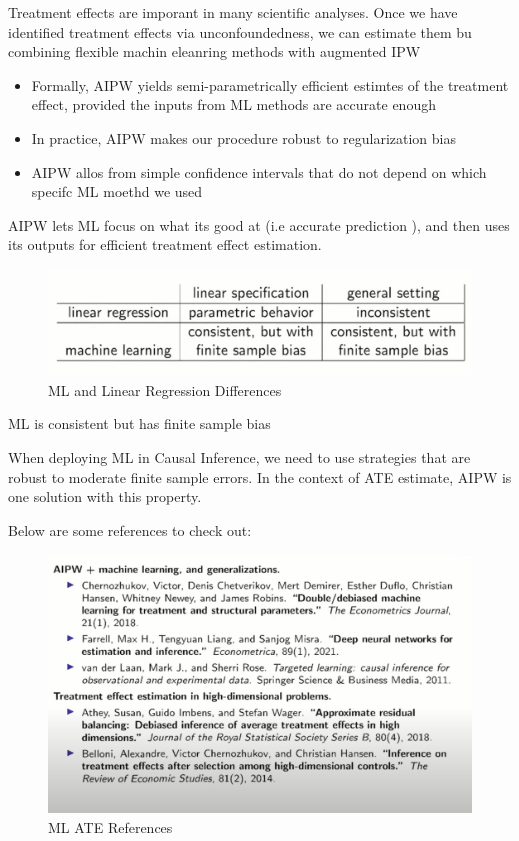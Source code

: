 \documentclass{article}
\begin{document}
Treatment effects are imporant in many scientific analyses. Once we have identified treatment effects via unconfoundedness, we can estimate them bu combining flexible machin eleanring methods with augmented IPW
\begin{itemize}
    \item Formally, AIPW yields semi-parametrically efficient estimtes of the treatment effect, provided the inputs from ML methods are accurate enough
    \item In practice, AIPW makes our procedure robust to regularization bias
    \item AIPW allos from simple confidence intervals that do not depend on which specifc ML moethd we used
\end{itemize}

AIPW lets ML focus on what its good at (i.e accurate prediction ), and then uses its outputs for efficient treatment effect estimation.

\begin{figure}[H]
    \centering
    \includegraphics[scale = 0.3]{ml_lm.png}
    \caption{ML and Linear Regression Differences}
    \label{fig:ml_lm}
\end{figure}

ML is consistent but has finite sample bias

When deploying ML in Causal Inference, we need to use strategies that are robust to moderate finite sample errors. In the context of ATE estimate, AIPW is one solution with this property.

Below are some references to check out:


\begin{figure}[H]
    \centering
    \includegraphics[scale = 0.3]{ref_ate.png}
    \caption{ML ATE References}
    \label{fig:ref}
\end{figure}
\end{document}

